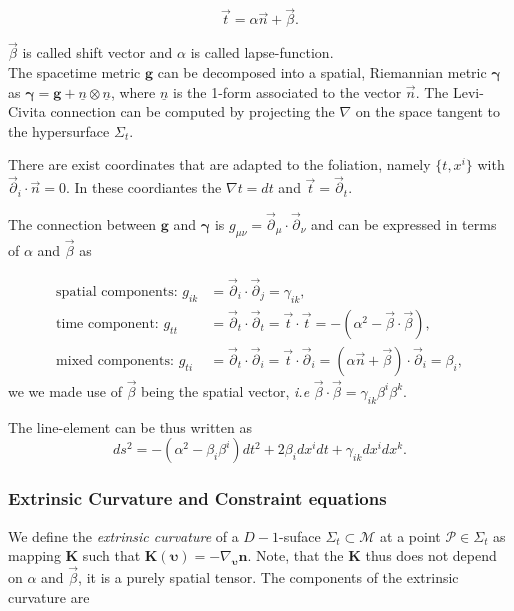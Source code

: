 \documentclass[11pt,a4paper,headinclude=true,DIV=14,BCOR=8mm,chapterprefix,listof=totoc,twoside,openright,abstracton]{scrbook}
\begin{document}
\begin{equation}
    \vec{t} = \alpha\vec{n}+\vec{\beta}.
\end{equation}

$\vec{\beta}$ is called shift vector and $\alpha$ is called lapse-function. \\

The spacetime metric $\boldsymbol{g}$ can be decomposed into a spatial, Riemannian metric $\boldsymbol{\gamma}$  as $\boldsymbol{\gamma} = \boldsymbol{g} + \underline{n} \otimes \underline{n} $, where $\underline{n}$ is the 1-form associated to the vector $\vec{n}$. The Levi-Civita connection can be computed by projecting the $\nabla$ on the space tangent to the hypersurface $\Sigma_t$.

There are exist coordinates that are adapted to the foliation, namely $\{t, x^i\}$ with $\vec{\partial}_i\cdot \vec{n} = 0$. In these coordiantes the $\nabla t = dt$ and $\vec{t} = \vec{\partial}_t$. 

The connection between $\boldsymbol{g}$ and $\boldsymbol{\gamma}$ is $g_{\mu\nu}=\vec{\partial}_{\mu}\cdot\vec{\partial}_{\nu} $ and can be expressed in terms of $\alpha$ and $\vec{\beta}$ as

\begin{align}
    \text{spatial components: } g_{ik}&=\vec{\partial}_{i}\cdot\vec{\partial}_{j} =\gamma_{ik}, \\
    \text{time component: } g_{tt} &= \vec{\partial}_{t}\cdot\vec{\partial}_{t} = \vec{t}\cdot\vec{t} = - (\alpha^2-\vec{\beta}\cdot\vec{\beta}), \\
    \text{mixed components: } g_{ti} &= \vec{\partial}_{t}\cdot\vec{\partial}_{i} = \vec{t}\cdot\vec{\partial}_i = (\alpha\vec{n}+\vec{\beta})\cdot\vec{\partial}_i=\beta_i,
\end{align}
we we made use of $\vec{\beta}$ being the spatial vector, \textit{i.e} $\vec{\beta}\cdot\vec{\beta}=\gamma_{ik}\beta^i\beta^k$.

The line-element can be thus written as
\begin{equation}
    ds^2 = -(\alpha^2-\beta_i\beta^i)dt^2 +2\beta_i dx^i dt + \gamma_{ik} dx^i dx^k.
\end{equation}

\subsubsection{Extrinsic Curvature and Constraint equations}

We define the \textit{extrinsic curvature} of a $D-1$-suface $\Sigma_t\subset\mathcal{M}$ at a point $\mathcal{P}\in\Sigma_t$ as mapping $\boldsymbol{K}$ such that $\boldsymbol{K}(\boldsymbol{\upsilon})=-\nabla_{\boldsymbol{\upsilon}}\boldsymbol{n}$. Note, that the $\boldsymbol{K}$ thus does not depend on $\alpha$ and $\vec{\beta}$, it is a purely spatial tensor. The components of the extrinsic curvature are \\
\end{document}
